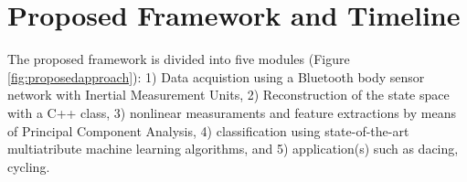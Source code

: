 
\chapter{Proposed Framework and Timeline}

\ifpdf
    \graphicspath{{Chapter3/Figs/Raster/}{Chapter3/Figs/PDF/}{Chapter3/Figs/}}
\else
    \graphicspath{{Chapter3/Figs/Vector/}{Chapter3/Figs/}}
\fi

The proposed framework is divided into five modules (Figure \ref{fig:proposedapproach}): 
1) Data acquistion using a Bluetooth body sensor network with Inertial Measurement Units, 
2) Reconstruction of the state space with a C++ class, 
3) nonlinear measuraments and feature extractions by means of Principal Component
Analysis, 
4) classification using state-of-the-art multiatribute machine learning algorithms, 
and  5) application(s) such as dacing, cycling. 

